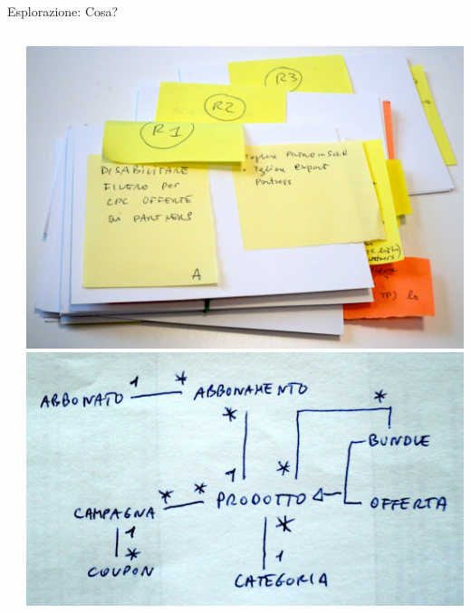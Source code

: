 \begin{frame}{Esplorazione: Cosa?}
\begin{columns}[T]
\begin{column}{0.6\textwidth}
	    \end{column}
	    \begin{column}{0.4\textwidth}
			\hspace*{-0.9cm} \includegraphics[scale=0.115]{images/stories}
			\\ \vspace*{0.4cm}
			\hspace*{-0.9cm} \includegraphics[scale=0.13]{images/domain-1}
	    \end{column}
	 \end{columns}
	\end{frame}
	
